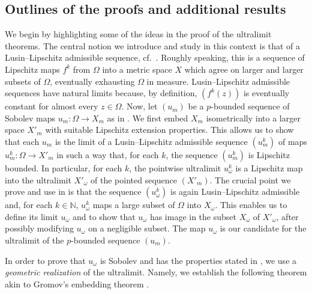 \documentclass[a4paper,leqno]{amsart}
\numberwithin{equation}{section}
\theoremstyle{remark}
\theoremstyle{remark}
\newcommand{\N}{\mathbb{N}}
\begin{document}
\subsection{Outlines of the proofs and additional results}
We begin by highlighting some of the ideas in the proof of the ultralimit theorems. 
The central notion we introduce and study in this context is that of a Lusin--Lipschitz admissible sequence, cf.~. Roughly speaking, this is a sequence of Lipschitz maps $f^k$ from $\Omega$ into a metric space $X$ which agree on larger and larger subsets of $\Omega$, eventually exhausting $\Omega$ in measure. Lusin--Lipschitz admissible sequences have natural limits because, by definition, $(f^k(z))$ is eventually constant for almost every $z\in\Omega$.  Now, let $(u_m)$ be a $p$-bounded sequence of Sobolev maps $u_m\colon\Omega\to X_m$ as in . We first embed $X_m$ isometrically into a larger space $X'_m$ with suitable Lipschitz extension properties. This allows us to show that each $u_m$ is the limit of a Lusin--Lipschitz admissible sequence $(u_m^k)$ of maps $u_m^k\colon\Omega\to X'_m$ in such a way that, for each $k$, the sequence $(u_m^k)$ is Lipschitz bounded. In particular, for each $k$, the pointwise ultralimit $u_\omega^k$ is a Lipschitz map into the ultralimit $X'_\omega$ of the pointed sequence $(X'_m)$. The crucial point we prove and use in  is that the sequence $(u_\omega^k)$ is again Lusin--Lipschitz admissible and, for each $k \in \N$, $u_\omega^k$ maps a large subset of $\Omega$ into $X_\omega$. This enables us to define its limit $u_\omega$ and to show that $u_\omega$ has image in the subset $X_\omega$ of $X'_\omega$, after possibly modifying $u_\omega$ on a negligible subset. The map $u_\omega$ is our candidate for the ultralimit of the $p$-bounded sequence $(u_m)$.

In order to prove that $u_\omega$ is Sobolev and has the properties stated in , we use a \emph{geometric realization} of the ultralimit. Namely, we establish the following theorem akin to Gromov's embedding theorem \cite[Section 6]{gromov-1981-groups-of-polynomial-growth-and-expanding-maps}.
\end{document}
